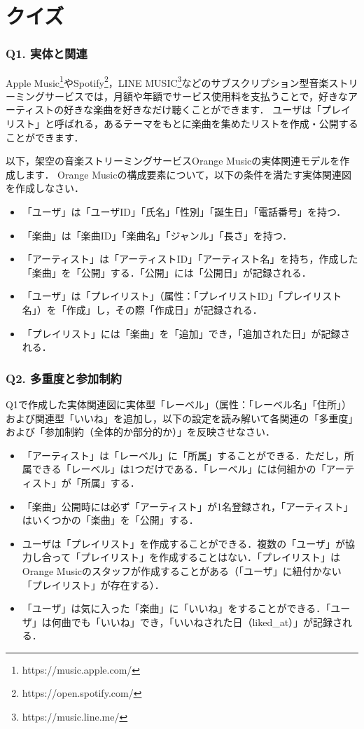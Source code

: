 \hrulefill
\section{クイズ}


\subsubsection{Q1. 実体と関連}
Apple Music\footnote{https://music.apple.com/}やSpotify\footnote{https://open.spotify.com/}，LINE MUSIC\footnote{https://music.line.me/}などのサブスクリプション型音楽ストリーミングサービスでは，月額や年額でサービス使用料を支払うことで，好きなアーティストの好きな楽曲を好きなだけ聴くことができます．
ユーザは「プレイリスト」と呼ばれる，あるテーマをもとに楽曲を集めたリストを作成・公開することができます．

以下，架空の音楽ストリーミングサービスOrange Musicの実体関連モデルを作成します．
Orange Musicの構成要素について，以下の条件を満たす実体関連図を作成しなさい．
\begin{itemize}
  \item 「ユーザ」は「ユーザID」「氏名」「性別」「誕生日」「電話番号」を持つ．
  \item 「楽曲」は「楽曲ID」「楽曲名」「ジャンル」「長さ」を持つ．
  \item 「アーティスト」は「アーティストID」「アーティスト名」を持ち，作成した「楽曲」を「公開」する．「公開」には「公開日」が記録される．
  \item 「ユーザ」は「プレイリスト」（属性：「プレイリストID」「プレイリスト名」）を「作成」し，その際「作成日」が記録される．
  \item 「プレイリスト」には「楽曲」を「追加」でき，「追加された日」が記録される．
\end{itemize}

\subsubsection{Q2. 多重度と参加制約}
Q1で作成した実体関連図に実体型「レーベル」（属性：「レーベル名」「住所」）および関連型「いいね」を追加し，以下の設定を読み解いて各関連の「多重度」および「参加制約（全体的か部分的か）」を反映させなさい．

\begin{itemize}
  \item 「アーティスト」は「レーベル」に「所属」することができる．ただし，所属できる「レーベル」は1つだけである．「レーベル」には何組かの「アーティスト」が「所属」する．
  \item 「楽曲」公開時には必ず「アーティスト」が1名登録され，「アーティスト」はいくつかの「楽曲」を「公開」する．
  \item ユーザは「プレイリスト」を作成することができる．複数の「ユーザ」が協力し合って「プレイリスト」を作成することはない．「プレイリスト」はOrange Musicのスタッフが作成することがある（「ユーザ」に紐付かない「プレイリスト」が存在する）．
  \item 「ユーザ」は気に入った「楽曲」に「いいね」をすることができる．「ユーザ」は何曲でも「いいね」でき，「いいねされた日（liked\_at）」が記録される．
\end{itemize}

